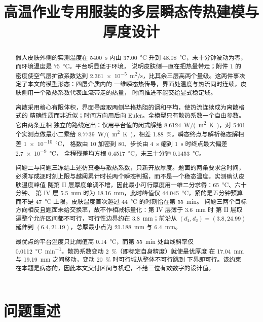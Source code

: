 \documentclass[withoutpreface,bwprint]{cumcmthesis}
\title{高温作业专用服装的多层瞬态传热建模与厚度设计}
\begin{document}
\begin{abstract}
假人皮肤外侧的实测温度在 \SI{5400}{s} 内由 \SI{37.00}{\celsius} 升到
\SI{48.08}{\celsius}，末十分钟波动为零，而环境温度是 \SI{75}{\celsius}。平台明显低于环境，
说明皮肤侧一直在把热量带走；附件 1 的密度使空气层扩散系数达到
\SI{2.361e-5}{m^2/s}，比其余三层高两个量级。这两件事决定了本文的模型形态：四层介质内的
一维瞬态热传导，界面处温度与热流同时连续，皮肤侧用一个散热系数代表血流带走的热量，
时间推进不能交给显式稳定域。

离散采用格心有限体积，界面导度取两侧半格热阻的调和平均，使热流连续成为离散格式的
精确性质而非近似；时间方向用后向 Euler。全模型只有散热系数一个自由参数。它由两条互相
独立的路线定出：仅用平台值的闭式解给 \SI{8.6124}{W/(m^2.K)}，对 5401 个实测点做最小二乘给
\SI{8.7739}{W/(m^2.K)}，相差 \SI{1.88}{\percent}。瞬态终点与解析稳态解相差 \SI{1e-10}{\celsius}，
格数由 10 加密到 80、步长由 \SI{4}{s} 缩到 \SI{1}{s} 时终点最大偏差 \SI{2.7e-9}{\celsius}，
全程残差均方根 \SI{0.4517}{\celsius}，末三十分钟 \SI{0.1453}{\celsius}。

问题二与问题三冻结上述仿真器与散热系数，只新开放厚度。题面的两条要求含时间，
必须写成逐时刻上限与越阈累计时长两个瞬态判据，而不是一个稳态温度。实测确认皮肤温度峰值
随第 II 层厚度单调不增，因此最小可行厚度用一维二分求得：\SI{65}{\celsius}、六十分钟、
第 IV 层 \SI{5.5}{mm} 时为 \SI{18.16}{mm}，此时峰值仅 \SI{44.045}{\celsius}，紧的是五分钟预算
而不是 \SI{47}{\celsius} 上限，皮肤温度首次越过 \SI{44}{\celsius} 的时刻恰在第 \SI{55}{min}。
问题三两个目标方向相反且题面未给交换率，故不作相减标量化：第 IV 层薄于 \SI{3.6}{mm} 时
第 II 层取遍整个允许区间都不可行，可行性边界约在 \SI{3.8}{mm}；前沿从
$(d_4,d_2)=(3.8,24.99)$ 延伸到 $(6.4,21.19)$，总厚最小点为 \SI{21.188}{mm} 与 \SI{6.4}{mm}。

最优点的平台温度只比阈值高 \SI{0.14}{\celsius}，而第 \SI{55}{min} 处曲线斜率仅
\SI{0.0112}{\celsius\per\minute}。散热系数变动 \SI{2}{\percent}（即标定自身精度）就使最优厚度
在 \SI{17.04}{mm} 与 \SI{19.19}{mm} 之间移动，变动 \SI{20}{\percent} 时可行域从整体不可行跳到
下界即可行。该约束在本题是病态的，因此本文交付区间与机理，不给三位有效数字的设计值。
\end{abstract}


\section{问题重述}
\label{mcm-body-start}
\end{document}
